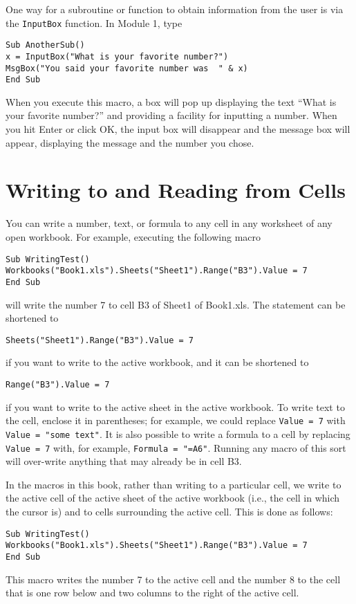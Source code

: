 One way for a subroutine or function to obtain information from the user is via the \verb!InputBox! function.   In Module 1, type
\small\begin{verbatim}
Sub AnotherSub()
x = InputBox("What is your favorite number?")
MsgBox("You said your favorite number was  " & x)
End Sub
\end{verbatim}\normalsize
When you execute this macro, a box will pop up displaying the text ``What is your favorite number?'' and providing a facility for inputting a number.  When you hit Enter or click OK, the input box will disappear and the message box will appear, displaying the message and the number you chose.



\section{Writing to and Reading from Cells}

You can write a number, text, or formula to any cell in any worksheet of any open workbook.  For example, executing the following macro
\small\begin{verbatim}
Sub WritingTest()
Workbooks("Book1.xls").Sheets("Sheet1").Range("B3").Value = 7
End Sub
\end{verbatim}\normalsize
will write the number 7 to cell B3 of Sheet1 of Book1.xls.  The statement can be shortened to
\small\begin{verbatim}
Sheets("Sheet1").Range("B3").Value = 7
\end{verbatim}\normalsize
if you want to write to the active workbook, 
and it can be shortened to
\small\begin{verbatim}
Range("B3").Value = 7
\end{verbatim}\normalsize
if you want to write to the active sheet in the active workbook.
To write text to the cell, enclose it in parentheses; for example, we could replace \verb!Value = 7! with \verb!Value = "some text"!.  It is also possible to write a formula to a cell by replacing  \verb!Value = 7! with, for example, \verb!Formula = "=A6"!.  Running any macro of this sort will over-write anything that may already be in cell B3.

In the macros in this book, rather than writing to a particular cell, we write to the active cell of the active sheet of the active workbook (i.e., the cell in which the cursor is) and to cells surrounding the active cell.  This is done as follows:
\small\begin{verbatim}
Sub WritingTest()
Workbooks("Book1.xls").Sheets("Sheet1").Range("B3").Value = 7
End Sub
\end{verbatim}\normalsize
This macro writes the number 7 to the active cell and the number 8 to the cell that is one row below and two columns to the right of the active cell. 

